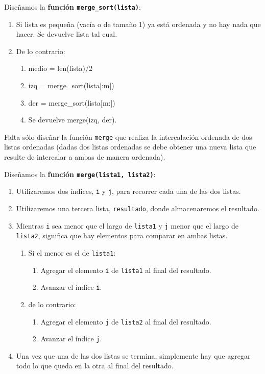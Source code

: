 Diseñamos la {\bf función \lstinline!merge_sort(lista)!}:

\begin{enumerate}
\item Si lista es pequeña (vacía o de tamaño 1) ya está ordenada y
no hay nada que hacer. Se devuelve lista tal cual.
\item De lo contrario:
\begin{enumerate}
\item medio = len(lista)/2
\item izq = merge\_sort(lista[:m])
\item der = merge\_sort(lista[m:])
\item Se devuelve merge(izq, der).
\end{enumerate}
\end{enumerate}

Falta sólo diseñar la función \lstinline!merge! que realiza la
intercalación ordenada de dos listas ordenadas (dadas dos listas ordenadas
se debe obtener una nueva lista que resulte de intercalar a ambas de manera
ordenada).

Diseñamos la {\bf función \lstinline!merge(lista1, lista2)!}:

\begin{enumerate}
\item Utilizaremos dos índices, \lstinline!i! y \lstinline!j!, para recorrer
cada una de las dos listas.
\item Utilizaremos una tercera lista, \lstinline!resultado!, donde
almacenaremos el resultado.

\item Mientras \lstinline!i! sea menor que el largo de \lstinline!lista1! y
\lstinline!j! menor que el largo de \lstinline!lista2!, significa que hay
elementos para comparar en ambas listas.

\begin{enumerate}
\item Si el menor es el de \lstinline!lista1!:
\begin{enumerate}
\item Agregar el elemento \lstinline!i! de \lstinline!lista1! al final del
resultado.  
\item Avanzar el índice \lstinline!i!.
\end{enumerate}
\item de lo contrario:
\begin{enumerate}
\item Agregar el elemento \lstinline!j! de \lstinline!lista2! al final del
resultado.
\item Avanzar el índice \lstinline!j!.
\end{enumerate}

\end{enumerate}

\item Una vez que una de las dos listas se termina, simplemente hay que
agregar todo lo que queda en la otra al final del resultado.
\end{enumerate}

